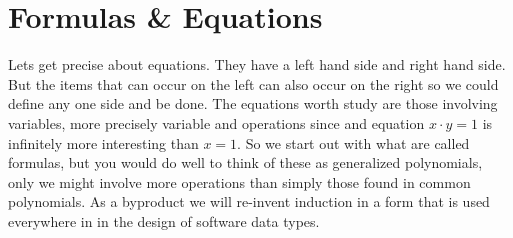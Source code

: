 \chapter{Formulas \& Equations}

Lets get precise about equations.  They have a left hand side and right hand side.
But the items that can occur on the left can also occur on the right so we could 
define any one side and be done.  The equations worth study are those involving 
variables, more precisely variable and operations since and equation $x\cdot y=1$ is 
infinitely more interesting than $x=1$.  So we start out with what are called 
formulas, but you would do well to think of these as generalized polynomials, 
only we might involve more operations than simply those found in common polynomials.
As a byproduct we will re-invent induction in a form that is used everywhere in 
in the design of software data types.  
